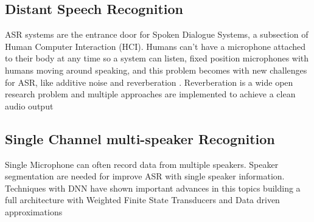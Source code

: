 \subsection{Distant Speech Recognition}
ASR systems are the entrance door for Spoken Dialogue Systems, a subsection of Human Computer Interaction (HCI). Humans can't have a microphone attached to their body at any time so a system can listen, fixed position microphones with humans moving around speaking, and this problem becomes with new challenges for ASR, like additive noise and reverberation \cite{Woelfel2009DistantRecognition}. Reverberation is a wide open research problem and multiple approaches are implemented to achieve a clean audio output \cite{Tsilfidis2013AutomaticPreprocessing,Ma2013TheChallenge,Vacher2015OnAutomation}
\subsection{Single Channel multi-speaker Recognition}
Single Microphone can often record data from multiple speakers. Speaker segmentation are needed for  improve ASR with single speaker information. Techniques with DNN have shown important advances in this topics building a full architecture with Weighted  Finite State Transducers \cite{Weng2015DeepRecognition} and Data driven approximations \cite{Du2016ANetworks}
